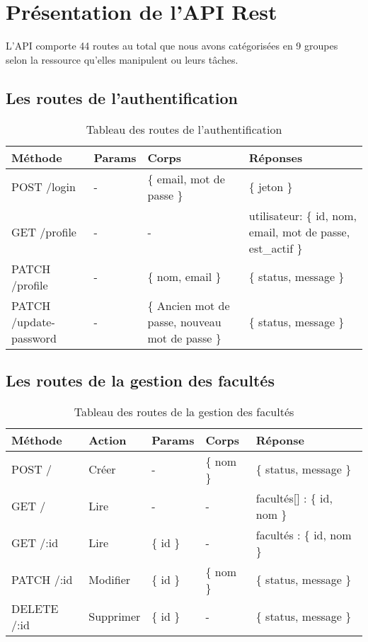 \section{Présentation de l'API Rest}\label{sec:presentation-de-l-api}
L'API comporte 44 routes au total que nous avons catégorisées en 9 groupes
selon la ressource qu'elles manipulent ou leurs t\^aches.

\subsection{Les routes de l'authentification}\label{subsec:routes-auth}

\begin{table}[ht]
  \centering
  \caption{Tableau des routes de l'authentification}
  \label{tab:routes-auth}
  \begin{tabular}{|p{2.5cm}|p{1cm}|p{3.5cm}|p{4cm}|}
    \hline
    Méthode  & Params & Corps & Réponses \\
    \hline
        POST   /login & - & \{ email, mot de passe \}  & \{ jeton \} \\
    \hline
        GET  /profile & - & - &  utilisateur: \{ id, nom, email, mot de passe, est\_actif \}  \\
    \hline
        PATCH /profile & - & \{ nom, email \} & \{ status, message \} \\
    \hline
        PATCH /update-password & - & \{ Ancien mot de passe, nouveau mot de passe \} & \{ status, message \} \\
    \hline
  \end{tabular}
\end{table}
\pagebreak

\subsection{Les routes de la gestion des facultés}\label{subsec:routes-fac}

\begin{table}[ht]
  \caption{Tableau des routes de la gestion des facultés}
  \label{tab:routes-fac}
  \begin{tabular}{|p{1.5cm}|p{1.5cm}|p{1.5cm}|p{1.5cm}|p{4cm}|}
    \hline
          Méthode & Action & Params & Corps & Réponse \\
      \hline
          POST /  & Créer &  - & \{ nom \} & \{ status, message \} \\
      \hline
          GET  / & Lire  & - & - & facultés[] : \{ id, nom \}  \\
      \hline
          GET /:id  & Lire  & \{ id \} & - & facultés : \{ id, nom \}  \\
      \hline
          PATCH  /:id  & Modifier & \{ id \} & \{ nom \} & \{ status, message \} \\
      \hline
          DELETE  /:id  & Supprimer & \{ id \} & - & \{ status, message \} \\
      \hline
  \end{tabular}
\end{table}
\pagebreak

